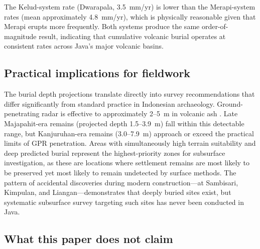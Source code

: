 \documentclass[12pt,a4paper]{article}
\begin{document}
The Kelud-system rate (Dwarapala, 3.5~mm/yr) is lower than the Merapi-system rates (mean approximately 4.8~mm/yr), which is physically reasonable given that Merapi erupts more frequently. Both systems produce the same order-of-magnitude result, indicating that cumulative volcanic burial operates at consistent rates across Java's major volcanic basins.

\subsection{Practical implications for fieldwork}

The burial depth projections translate directly into survey recommendations that differ significantly from standard practice in Indonesian archaeology. Ground-penetrating radar is effective to approximately 2--5~m in volcanic ash \citep{conyers2004}. Late Majapahit-era remains (projected depth 1.5--3.9~m) fall within this detectable range, but Kanjuruhan-era remains (3.0--7.9~m) approach or exceed the practical limits of GPR penetration. Areas with simultaneously high terrain suitability and deep predicted burial represent the highest-priority zones for subsurface investigation, as these are locations where settlement remains are most likely to be preserved yet most likely to remain undetected by surface methods. The pattern of accidental discoveries during modern construction---at Sambisari, Kimpulan, and Liangan---demonstrates that deeply buried sites exist, but systematic subsurface survey targeting such sites has never been conducted in Java.

\subsection{What this paper does not claim}
\end{document}
